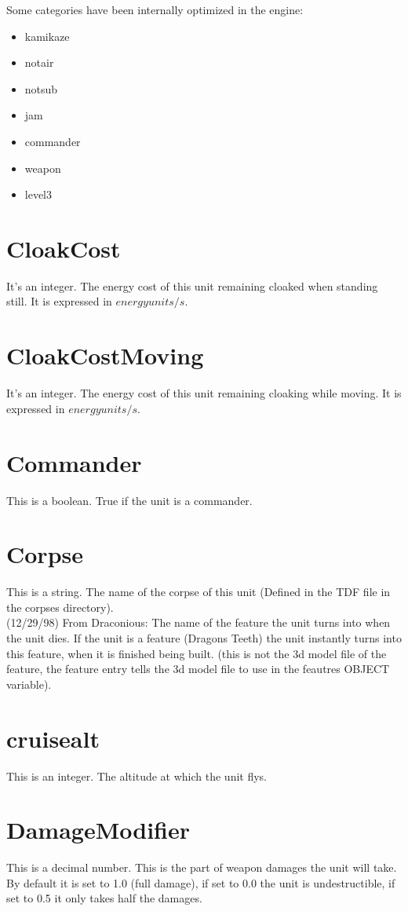 \documentclass[a4paper,10pt]{article}
\begin{document}
Some categories have been internally optimized in the engine:
\begin{itemize}
 \item kamikaze
 \item notair
 \item notsub
 \item jam
 \item commander
 \item weapon
 \item level3
\end{itemize}


\section{CloakCost}
It's an integer. The energy cost of this unit remaining cloaked when standing still. It is expressed in $energy units/s$.

\section{CloakCostMoving}
It's an integer. The energy cost of this unit remaining cloaking while moving. It is expressed in $energy units/s$.

\section{Commander}
This is a boolean. True if the unit is a commander.

\section{Corpse}
This is a string. The name of the corpse of this unit (Defined in the TDF file in the corpses directory).\\

(12/29/98)  From Draconious:  The name of the feature the unit turns into when the unit dies. If the unit is a feature (Dragons Teeth) the unit instantly turns into this feature, when it is finished being built. (this is not the 3d model file of the feature, the feature entry tells the 3d model file to use in the feautres OBJECT variable).

\section{cruisealt}
This is an integer. The altitude at which the unit flys.

\section{DamageModifier}
This is a decimal number. This is the part of weapon damages the unit will take. By default it is set to 1.0 (full damage), if set to 0.0 the unit is undestructible, if set to 0.5 it only takes half the damages.
\end{document}
